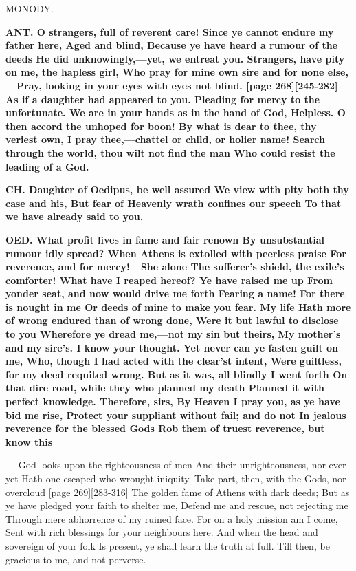 \documentclass[11pt,letter]{book}
\begin{document}
\par  MONODY.

\par \textbf{ANT. O strangers, full of reverent care! Since ye cannot endure my father here, Aged and blind, Because ye have heard a rumour of the deeds He did unknowingly,—yet, we entreat you. Strangers, have pity on me, the hapless girl, Who pray for mine own sire and for none else, —Pray, looking in your eyes with eyes not blind. [page 268][245-282] As if a daughter had appeared to you. Pleading for mercy to the unfortunate. We are in your hands as in the hand of God, Helpless. O then accord the unhoped for boon! By what is dear to thee, thy veriest own, I pray thee,—chattel or child, or holier name! Search through the world, thou wilt not find the man Who could resist the leading of a God.}
\par 

\par \textbf{CH. Daughter of Oedipus, be well assured We view with pity both thy case and his, But fear of Heavenly wrath confines our speech To that we have already said to you.}
\par 

\par \textbf{OED. What profit lives in fame and fair renown By unsubstantial rumour idly spread? When Athens is extolled with peerless praise For reverence, and for mercy!—She alone The sufferer’s shield, the exile’s comforter! What have I reaped hereof? Ye have raised me up From yonder seat, and now would drive me forth Fearing a name! For there is nought in me Or deeds of mine to make you fear. My life Hath more of wrong endured than of wrong done, Were it but lawful to disclose to you Wherefore ye dread me,—not my sin but theirs, My mother’s and my sire’s. I know your thought. Yet never can ye fasten guilt on me, Who, though I had acted with the clear’st intent, Were guiltless, for my deed requited wrong. But as it was, all blindly I went forth On that dire road, while they who planned my death Planned it with perfect knowledge. Therefore, sirs, By Heaven I pray you, as ye have bid me rise, Protect your suppliant without fail; and do not In jealous reverence for the blessed Gods Rob them of truest reverence, but know this}
\par  — God looks upon the righteousness of men And their unrighteousness, nor ever yet Hath one escaped who wrought iniquity. Take part, then, with the Gods, nor overcloud [page 269][283-316] The golden fame of Athens with dark deeds; But as ye have pledged your faith to shelter me, Defend me and rescue, not rejecting me Through mere abhorrence of my ruined face. For on a holy mission am I come, Sent with rich blessings for your neighbours here. And when the head and sovereign of your folk Is present, ye shall learn the truth at full. Till then, be gracious to me, and not perverse.
\end{document}

